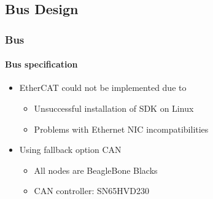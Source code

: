\documentclass{beamer}
\begin{document}
%
%
%
%

\subsection{Bus Design}
\begin{frame}
  \frametitle{Bus}
  \framesubtitle{Bus specification}
  \begin{itemize}
    \item EtherCAT could not be implemented due to
		\begin{itemize}
			\item Unsuccessful installation of SDK on Linux
			\item Problems with Ethernet NIC incompatibilities 
		\end{itemize}
		\vfill
    \item Using fallback option CAN
		\begin{itemize}
			\item All nodes are BeagleBone Blacks
			\item CAN controller: SN65HVD230
		\end{itemize}
  \end{itemize}
\end{frame}
\end{document}
